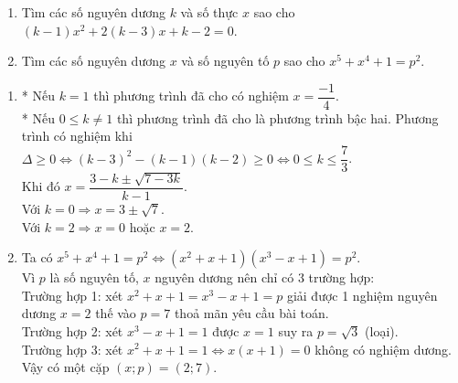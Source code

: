 \begin{ex}%
    \begin{enumerate}    
        \item Tìm các số nguyên dương $k$ và số thực $x$ sao cho $(k-1)x^{2}+2(k-3)x+k-2=0$.
        \item Tìm các số nguyên dương $x$ và số nguyên tố $p$ sao cho $x^{5}+x^{4}+1=p^{2}$.
    \end{enumerate}
\loigiai
    {\begin{enumerate}    
        \item * Nếu $k=1$ thì phương trình đã cho có nghiệm $x=\dfrac{-1}{4}$.\\
				* Nếu $0 \le k \ne 1$  thì phương trình đã cho là phương trình bậc hai. Phương trình có nghiệm khi $\Delta \ge 0 \Leftrightarrow (k-3)^2-(k-1)(k-2) \ge 0 \Leftrightarrow 0 \le k \le \dfrac{7}{3}$.\\
Khi đó $x=\dfrac{3-k \pm \sqrt{7-3k}}{k-1}$.\\
Với $k=0 \Rightarrow x=3 \pm \sqrt{7}$.\\
Với $k=2 \Rightarrow x=0$  hoặc $x=2$.
        \item Ta có $x^5+x^4+1=p^2 \Leftrightarrow (x^2+x+1) (x^3-x+1) = p^2$.\\
Vì $p$ là số nguyên tố, $x$ nguyên dương nên chỉ có 3 trường hợp:\\
Trường hợp 1: xét $x^2+x+1=x^3-x+1=p$ giải được 1 nghiệm nguyên dương $x=2$ thế vào $p=7$ thoả mãn yêu cầu bài toán.\\
Trường hợp 2: xét $x^3-x+1=1$ được $x=1$ suy ra $p=\sqrt{3}$ (loại).\\
Trường hợp 3: xét $x^2+x+1=1 \Leftrightarrow x(x+1)=0$ không có nghiệm dương.\\
Vậy có một cặp $(x;p) =(2;7)$.
    \end{enumerate}
    }
\end{ex}

